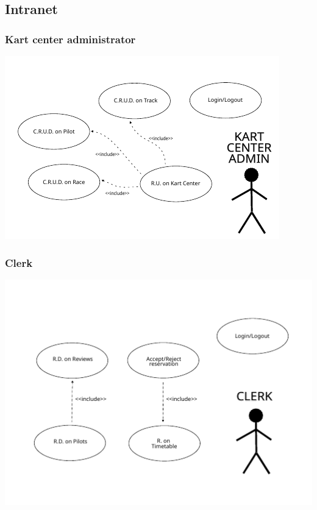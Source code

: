 \documentclass{beamer}
\begin{document}
\subsection*{Intranet}

\begin{frame}
    \frametitle{Kart center administrator}
    \centering
    \includegraphics[width=0.9\linewidth]{drawings/uc-kcadmin.pdf}
\end{frame}

\begin{frame}
    \frametitle{Clerk}
    \centering
    \includegraphics[width=0.9\linewidth]{drawings/uc-clerk.pdf}
\end{frame}
\end{document}
